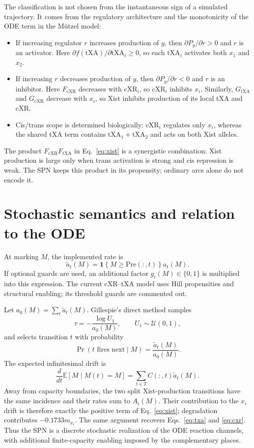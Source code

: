 \documentclass[11pt,a4paper]{article}
\newcommand{\txa}{\mathrm{tXA}}
\newcommand{\cxr}{\mathrm{cXR}}
\newcommand{\Pre}{\mathrm{Pre}}
\newcommand{\ind}{\mathbf{1}}
\begin{document}
The classification is not chosen from the instantaneous sign of a simulated
trajectory.  It comes from the regulatory architecture and the monotonicity
of the ODE term in the M\"utzel model:
\begin{itemize}
  \item If increasing regulator $r$ increases production of $y$, then
        $\partial P_y/\partial r>0$ and $r$ is an activator.  Here
        $\partial f(\txa)/\partial\txa_i\geq0$, so each $\txa_i$ activates
        both $x_1$ and $x_2$.
  \item If increasing $r$ decreases production of $y$, then
        $\partial P_y/\partial r<0$ and $r$ is an inhibitor.  Here
        $F_{\cxr}$ decreases with $\cxr_i$, so $\cxr_i$ inhibits $x_i$.
        Similarly, $G_{\txa}$ and $G_{\cxr}$ decrease with $x_i$, so Xist
        inhibits production of its local tXA and cXR.
  \item Cis/trans scope is determined biologically: $\cxr_i$ regulates only
        $x_i$, whereas the shared tXA term contains $\txa_1+\txa_2$ and acts
        on both Xist alleles.
\end{itemize}

The product $F_{\cxr}F_{\txa}$ in Eq.~\eqref{eq:xist} is a synergistic
combination: Xist production is large only when trans activation is strong
and cis repression is weak.  The SPN keeps this product in its propensity;
ordinary arcs alone do not encode it.

\section{Stochastic semantics and relation to the ODE}

At marking $M$, the implemented rate is
\[
 \widetilde a_t(M)=
 \ind\!\left\{M\geq\Pre(:,t)\right\}a_t(M).
\]
If optional guards are used, an additional factor $g_t(M)\in\{0,1\}$ is
multiplied into this expression.  The current cXR--tXA model uses Hill
propensities and structural enabling; its threshold guards are commented out.

Let $a_0(M)=\sum_t\widetilde a_t(M)$.  Gillespie's direct method samples
\[
 \tau=-\frac{\log U_1}{a_0(M)},\qquad U_1\sim\mathcal U(0,1),
\]
and selects transition $t$ with probability
\[
 \Pr(t\text{ fires next}\mid M)=\frac{\widetilde a_t(M)}{a_0(M)}.
\]
The expected infinitesimal drift is
\[
 \frac{d}{dt}\mathbb E[M\mid M(t)=M]
   =\sum_{t\in T}C(:,t)\widetilde a_t(M).
\]
Away from capacity boundaries, the two split Xist-production transitions have
the same incidence and their rates sum to $A_i(M)$.  Their contribution to the
$x_i$ drift is therefore exactly the positive term of
Eq.~\eqref{eq:xist}; degradation contributes $-0.1733m_{x_i}$.  The same
argument recovers Eqs.~\eqref{eq:txa} and \eqref{eq:cxr}.  Thus the SPN is a
discrete stochastic realization of the ODE reaction channels, with additional
finite-capacity enabling imposed by the complementary places.
\end{document}
